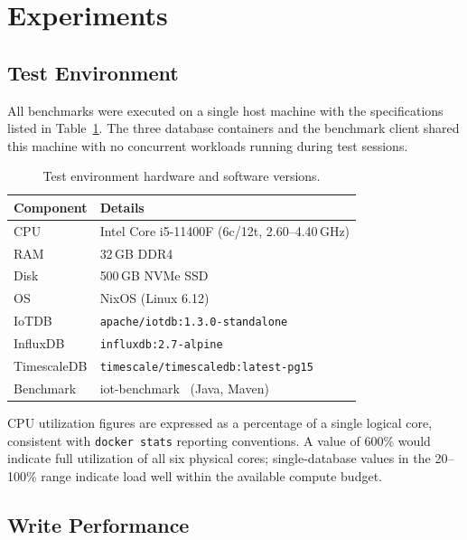 \section{Experiments}
\label{sec:experiments}

\subsection{Test Environment}

All benchmarks were executed on a single host machine with the specifications listed in
Table~\ref{tab:hardware}. The three database containers and the benchmark client
shared this machine with no concurrent workloads running during test sessions.

\begin{table}[t]
  \centering
  \caption{Test environment hardware and software versions.}
  \label{tab:hardware}
  \begin{tabular}{ll}
    \hline
    \textbf{Component} & \textbf{Details} \\
    \hline
    CPU       & Intel Core i5-11400F (6c/12t, 2.60--4.40\,GHz) \\
    RAM       & 32\,GB DDR4 \\
    Disk      & 500\,GB NVMe SSD \\
    OS        & NixOS (Linux 6.12) \\
    \hline
    IoTDB       & \texttt{apache/iotdb:1.3.0-standalone} \\
    InfluxDB    & \texttt{influxdb:2.7-alpine} \\
    TimescaleDB & \texttt{timescale/timescaledb:latest-pg15} \\
    Benchmark   & iot-benchmark~\cite{iotbenchmark} (Java, Maven) \\
    \hline
  \end{tabular}
\end{table}

CPU utilization figures are expressed as a percentage of a single logical core, consistent
with \texttt{docker stats} reporting conventions. A value of 600\% would indicate full
utilization of all six physical cores; single-database values in the 20--100\% range
indicate load well within the available compute budget.

\subsection{Write Performance}
\label{sec:write-results}


